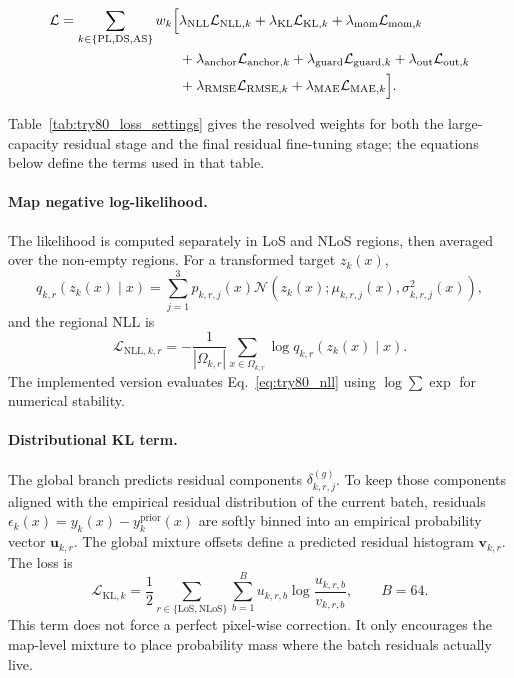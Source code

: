 \begin{equation}
\begin{aligned}
\mathcal{L}
=
\sum_{k\in\{\mathrm{PL},\mathrm{DS},\mathrm{AS}\}}
w_k
\Bigl[
&\lambda_{\mathrm{NLL}}\mathcal{L}_{\mathrm{NLL},k}
+
\lambda_{\mathrm{KL}}\mathcal{L}_{\mathrm{KL},k}
+
\lambda_{\mathrm{mom}}\mathcal{L}_{\mathrm{mom},k}
\\
&+
\lambda_{\mathrm{anchor}}\mathcal{L}_{\mathrm{anchor},k}
+
\lambda_{\mathrm{guard}}\mathcal{L}_{\mathrm{guard},k}
+
\lambda_{\mathrm{out}}\mathcal{L}_{\mathrm{out},k}
\\
&+
\lambda_{\mathrm{RMSE}}\mathcal{L}_{\mathrm{RMSE},k}
+
\lambda_{\mathrm{MAE}}\mathcal{L}_{\mathrm{MAE},k}
\Bigr].
\end{aligned}
\label{eq:try80_total_loss}
\end{equation}

Table~\ref{tab:try80_loss_settings} gives the resolved weights for both the
large-capacity residual stage and the final residual fine-tuning stage; the
equations below define the terms used in that table.

\paragraph{Map negative log-likelihood.}
The likelihood is computed separately in LoS and NLoS regions, then averaged
over the non-empty regions. For a transformed target \(z_k(x)\),
\begin{equation}
q_{k,r}\!\left(z_k(x)\mid x\right)
=
\sum_{j=1}^{3}
p_{k,r,j}(x)
\mathcal{N}
\left(
z_k(x);
\mu_{k,r,j}(x),
\sigma^2_{k,r,j}(x)
\right),
\label{eq:try80_mixture_density}
\end{equation}
and the regional NLL is
\begin{equation}
\mathcal{L}_{\mathrm{NLL},k,r}
=
-
\frac{1}{|\Omega_{k,r}|}
\sum_{x\in\Omega_{k,r}}
\log q_{k,r}\!\left(z_k(x)\mid x\right).
\label{eq:try80_nll}
\end{equation}
The implemented version evaluates Eq.~\eqref{eq:try80_nll} using
\(\log\sum\exp\) for numerical stability.

\paragraph{Distributional KL term.}
The global branch predicts residual components
\(\delta^{(g)}_{k,r,j}\). To keep those components aligned with the empirical
residual distribution of the current batch, residuals
\(\epsilon_k(x)=y_k(x)-y^{\mathrm{prior}}_k(x)\) are softly binned into an
empirical probability vector \(\textbf{u}_{k,r}\). The global mixture offsets
define a predicted residual histogram \(\textbf{v}_{k,r}\). The loss is
\begin{equation}
\mathcal{L}_{\mathrm{KL},k}
=
\frac{1}{2}
\sum_{r\in\{\mathrm{LoS},\mathrm{NLoS}\}}
\sum_{b=1}^{B}
u_{k,r,b}
\log
\frac{u_{k,r,b}}{v_{k,r,b}},
\qquad B=64.
\label{eq:try80_kl}
\end{equation}
This term does not force a perfect pixel-wise correction. It only encourages
the map-level mixture to place probability mass where the batch residuals
actually live.


